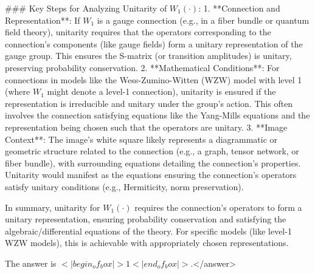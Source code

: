 ### Key Steps for Analyzing Unitarity of \( W_1(\cdot) \):  
1. **Connection and Representation**: If \( W_1 \) is a gauge connection (e.g., in a fiber bundle or quantum field theory), unitarity requires that the operators corresponding to the connection’s components (like gauge fields) form a unitary representation of the gauge group. This ensures the S-matrix (or transition amplitudes) is unitary, preserving probability conservation.  
2. **Mathematical Conditions**: For connections in models like the Wess-Zumino-Witten (WZW) model with level 1 (where \( W_1 \) might denote a level-1 connection), unitarity is ensured if the representation is irreducible and unitary under the group’s action. This often involves the connection satisfying equations like the Yang-Mills equations and the representation being chosen such that the operators are unitary.  
3. **Image Context**: The image’s white square likely represents a diagrammatic or geometric structure related to the connection (e.g., a graph, tensor network, or fiber bundle), with surrounding equations detailing the connection’s properties. Unitarity would manifest as the equations ensuring the connection’s operators satisfy unitary conditions (e.g., Hermiticity, norm preservation).  


In summary, unitarity for \( W_1(\cdot) \) requires the connection’s operators to form a unitary representation, ensuring probability conservation and satisfying the algebraic/differential equations of the theory. For specific models (like level-1 WZW models), this is achievable with appropriately chosen representations.  

The answer is \(<|begin_of_box|>1<|end_of_box|>\).</answer>